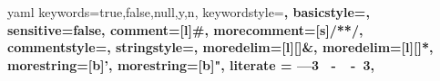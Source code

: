 

\usepackage[utf8]{inputenc}        %
\usepackage{graphicx}              %
\usepackage{hyperref}              %
\usepackage{amsmath}              %
\usepackage[numbers]{natbib}       %
\newcommand{\parencite}[1]{\citep{#1}} %
\newcommand{\textcite}[1]{\citet{#1}} %
\usepackage{xspace}                %


\usepackage{booktabs}              %
\usepackage{multirow}              %
\usepackage{diagbox}               %
\usepackage[flushleft]{threeparttable} %


\usepackage[caption=false]{subfig} %


\usepackage{listings}
\usepackage[htt]{hyphenat}         %

\newcommand\YAMLcolonstyle{\color{red}\mdseries}
\newcommand\YAMLkeystyle{\color{black}\bfseries}
\newcommand\YAMLvaluestyle{\color{blue}\mdseries}

\makeatletter
\newcommand\language@yaml{yaml}
\expandafter\expandafter\expandafter\lstdefinelanguage
\expandafter{\language@yaml}
{
  keywords={true,false,null,y,n},
  keywordstyle=\color{darkgray}\bfseries,
  basicstyle=\YAMLkeystyle,
  sensitive=false,
  comment=[l]{\#},
  morecomment=[s]{/*}{*/},
  commentstyle=\color{purple}\ttfamily,
  stringstyle=\YAMLvaluestyle\ttfamily,
  moredelim=[l][\color{orange}]{\&},
  moredelim=[l][\color{magenta}]{*},
  morestring=[b]',
  morestring=[b]",
  literate = {---}{{\ProcessThreeDashes}}3
             {\ -\ }{{\mdseries\ -\ }}3,
}
\makeatother


\usepackage{tikz}
\usepackage[framemethod=TikZ]{mdframed}


